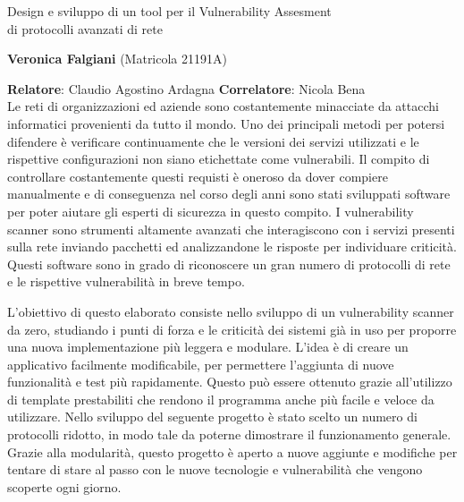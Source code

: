 \documentclass{article}
\begin{document}
\begin{center}
    \begin{center}
        \Large Design e sviluppo di un tool per il Vulnerability Assesment \\di protocolli avanzati di rete
    \end{center}
    \vspace{2mm}
    \large\textbf{Veronica Falgiani} (Matricola 21191A)
\end{center}
\textbf{Relatore}: Claudio Agostino Ardagna
\hfill
\textbf{Correlatore}: Nicola Bena \\

\noindent
Le reti di organizzazioni ed aziende sono costantemente minacciate da attacchi informatici provenienti da tutto il mondo. Uno dei principali metodi per potersi difendere è verificare continuamente che le versioni dei servizi utilizzati e le rispettive configurazioni non siano etichettate come vulnerabili. Il compito di controllare costantemente questi requisti è oneroso da dover compiere manualmente e di conseguenza nel corso degli anni sono stati sviluppati software per poter aiutare gli esperti di sicurezza in questo compito. I vulnerability scanner sono strumenti altamente avanzati che interagiscono con i servizi presenti sulla rete inviando pacchetti ed analizzandone le risposte per individuare criticità. Questi software sono in grado di riconoscere un gran numero di protocolli di rete e le rispettive vulnerabilità in breve tempo.

L'obiettivo di questo elaborato consiste nello sviluppo di un vulnerability scanner da zero, studiando i punti di forza e le criticità dei sistemi già in uso per proporre una nuova implementazione più leggera e modulare. L'idea è di creare un applicativo facilmente modificabile, per permettere l'aggiunta di nuove funzionalità e test più rapidamente. Questo può essere ottenuto grazie all'utilizzo di template prestabiliti che rendono il programma anche più facile e veloce da utilizzare. Nello sviluppo del seguente progetto è stato scelto un numero di protocolli ridotto, in modo tale da poterne dimostrare il funzionamento generale. Grazie alla modularità, questo progetto è aperto a nuove aggiunte e modifiche per tentare di stare al passo con le nuove tecnologie e vulnerabilità che vengono scoperte ogni giorno.
\end{document}
